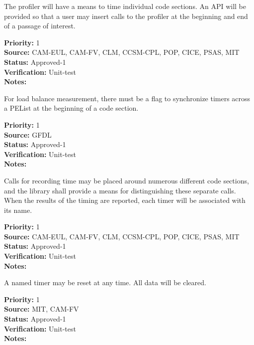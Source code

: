 

The profiler will have a means to time individual code sections.  An API will be 
provided so that a user may insert calls to the profiler at the beginning and
end of a passage of interest.

\begin{reqlist}
{\bf Priority:} 1 \\
{\bf Source:} CAM-EUL, CAM-FV, CLM, CCSM-CPL, POP, CICE, PSAS, MIT \\
{\bf Status:} Approved-1 \\
{\bf Verification:} Unit-test \\
{\bf Notes:} 
\end{reqlist}


For load balance measurement, there must be a flag to synchronize
timers across a PEList at the beginning of a code section.

\begin{reqlist}
{\bf Priority:} 1 \\
{\bf Source:} GFDL \\
{\bf Status:} Approved-1 \\
{\bf Verification:} Unit-test \\
{\bf Notes:} 
\end{reqlist}


Calls for recording time may be placed around numerous different code sections, 
and the library shall provide a means for distinguishing these separate calls.  When
the results of the timing are reported, each timer will be associated with its name.

\begin{reqlist}
{\bf Priority:} 1 \\
{\bf Source:} CAM-EUL, CAM-FV, CLM, CCSM-CPL, POP, CICE, PSAS, MIT \\
{\bf Status:} Approved-1 \\
{\bf Verification:} Unit-test \\
{\bf Notes:} 
\end{reqlist}


A named timer may be reset at any time.  All data will be cleared.

\begin{reqlist}
{\bf Priority:} 1 \\
{\bf Source:} MIT, CAM-FV \\
{\bf Status:} Approved-1 \\
{\bf Verification:} Unit-test \\
{\bf Notes:} 
\end{reqlist}

